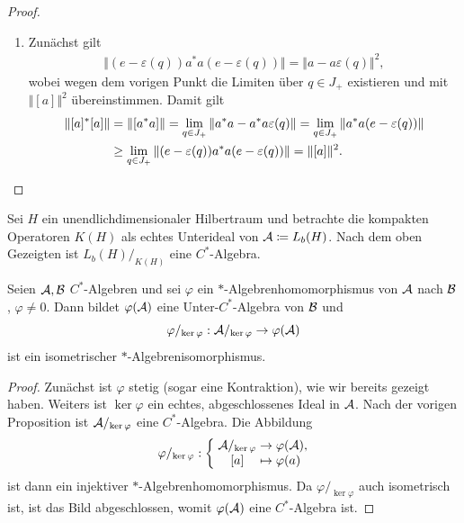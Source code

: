 \begin{proof}{\ }
\begin{enumerate}
        \item Zunächst gilt
        \begin{align*}
            \Vert (e - \varepsilon(q)) a^* a (e - \varepsilon(q)) \Vert = \Vert a - a \varepsilon(q) \Vert^2,
        \end{align*}
        wobei wegen dem vorigen Punkt die Limiten über $q \in J_+$ existieren und mit $\Vert [a] \Vert^2$ übereinstimmen. Damit gilt
        \begin{align*}
            \Vert [a]^* [a] \Vert
            &=
            \Vert [a^* a] \Vert
            =
            \lim_{q \in J_+} \Vert a^* a - a^* a \varepsilon(q) \Vert
            =
            \lim_{q \in J_+} \Vert a^* a (e - \varepsilon(q)) \Vert \\
            &\geq
            \lim_{q \in J_+} \Vert (e - \varepsilon(q)) a^* a (e - \varepsilon(q)) \Vert
            =
            \Vert [a] \Vert^2. \qedhere
        \end{align*}
    \end{enumerate}
\end{proof}

\begin{example}
    Sei $H$ ein unendlichdimensionaler Hilbertraum und betrachte die kompakten Operatoren $K(H)$ als echtes Unterideal von $\mathcal{A} \coloneqq L_b(H)$. Nach dem oben Gezeigten ist $L_b(H)/_{K(H)}$ eine $C^*$-Algebra.
\end{example}

\begin{corollary}
    Seien $\mathcal{A}, \mathcal{B}$ $C^*$-Algebren und sei $\varphi$ ein $\ast$-Algebrenhomomorphismus von $\mathcal{A}$ nach $\mathcal{B}$, $\varphi \neq 0$. Dann bildet $\varphi(\mathcal{A})$ eine Unter-$C^*$-Algebra von $\mathcal{B}$ und
    \[
        \varphi/_{\ker \varphi} : \mathcal{A}/_{\ker \varphi} \to \varphi(\mathcal{A})
    \]
    ist ein isometrischer $\ast$-Algebrenisomorphismus.
\end{corollary}

\begin{proof}
    Zunächst ist $\varphi$ stetig (sogar eine Kontraktion), wie wir bereits gezeigt haben. Weiters ist $\ker \varphi$ ein echtes, abgeschlossenes Ideal in $\mathcal{A}$. Nach der vorigen Proposition ist $\mathcal{A} /_{\ker \varphi}$ eine $C^*$-Algebra. Die Abbildung
    \[
        \mapping{\varphi/_{\ker \varphi}}
            {\Aa/_{\ker \varphi} & \to & \varphi(\Aa),}
            {\textrm{[}a\textrm{]} & \mapsto & \varphi(a)}
    \]
    ist dann ein injektiver $\ast$-Algebrenhomomorphismus. Da $\varphi/_{\ker \varphi}$ auch isometrisch ist, ist das Bild abgeschlossen, womit $\varphi(\mathcal{A})$ eine $C^*$-Algebra ist.
\end{proof}

